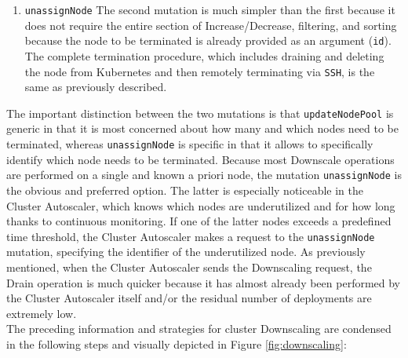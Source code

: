 \begin{enumerate}
  \item \texttt{unassignNode}
    \newline
    The second mutation is much simpler than the first because it does not
    require the entire section of Increase/Decrease, filtering, and sorting
    because the node to be terminated is already provided as an argument (\texttt{id}).
    \newline
    The complete termination procedure, which includes draining and deleting the
    node from Kubernetes and then remotely terminating via \texttt{SSH}, is the same
    as previously described.
\end{enumerate}
The important distinction between the two mutations is that \texttt{updateNodePool}
is generic in that it is most concerned about how many and which nodes need to
be terminated, whereas \texttt{unassignNode} is specific in that it allows to
specifically identify which node needs to be terminated. Because most Downscale operations
are performed on a single and known a priori node, the mutation \texttt{unassignNode}
is the obvious and preferred option. The latter is especially noticeable in the
Cluster Autoscaler, which knows which nodes are underutilized and for how long thanks
to continuous monitoring. If one of the latter nodes exceeds a predefined time
threshold, the Cluster Autoscaler makes a request to the \texttt{unassignNode}
mutation, specifying the identifier of the underutilized node. As previously
mentioned, when the Cluster Autoscaler sends the Downscaling request, the Drain
operation is much quicker because it has almost already been performed by the
Cluster Autoscaler itself and/or the residual number of deployments are
extremely low. \\ %
The preceding information and strategies for cluster Downscaling are condensed
in the following steps and visually depicted in Figure \ref{fig:downscaling}:
